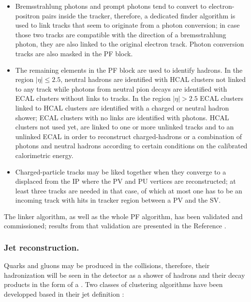 \begin{itemize}
\item Bremsstrahlung photons and prompt photons tend to convert to electron-positron pairs inside the tracker, therefore, a dedicated finder algorithm is used to link tracks that seem to originate from a photon conversion; in case those two tracks are compatible with the direction of a bremsstrahlung photon, they are also linked to the original electron track. Photon conversion tracks are also masked in the PF block.

\item The remaining elements in the PF block are used to identify hadrons. In the region $|\eta| \leq 2.5$, neutral hadrons are identified with HCAL clusters not linked to any track while photons from neutral pion decays are identified with ECAL clusters without links to tracks. In the region $|\eta| >2.5$ ECAL clusters linked to HCAL clusters are identified with a charged or neutral hadron shower; ECAL clusters with no links are identified with photons.
  HCAL clusters not used yet, are linked to one or more unlinked tracks and to an unlinked ECAL in order to reconstruct charged-hadrons or a combination of photons and neutral hadrons according to certain conditions on the calibrated calorimetric energy.         

\item Charged-particle tracks may be liked together when they converge to a  displaced from the IP where the PV and PU vertices are reconstructed; at least three tracks are needed in that case, of which at most one has to be an incoming track with hits in tracker region between a PV and the SV.
\end{itemize}

The linker algorithm, as well as the whole PF algorithm, has been validated and commissioned; results from that validation are presented in the Reference \cite{particle_flow}.

\subsubsection*{Jet reconstruction.}

Quarks and gluons may be produced in the \pp collisions, therefore, their hadronization will be seen in the detector as a shower of hadrons and their decay products in the form of a . Two classes of clustering algorithms have been developped based in their jet definition \cite{coco}:  

